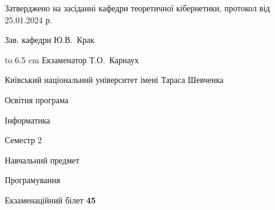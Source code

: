 \documentclass[12pt, ukrainian]{article}
\begin{document}
{\smallskip\smallskip \begin {scriptsize} Затверджено на засіданні кафедри теоретичної кібернетики, протокол   від   25.01.2024 р.\par\smallskip\smallskip\smallskip\smallskip
{\parbox {6.5 cm} {Зав. кафедри \dotfill Ю.В.~Крак}}\hspace {0.7cm} {\hbox to 6.5 cm { Екзаменатор \dotfill Т.О.~Карнаух}} \end{scriptsize}}
\newpage
{{\begin {scriptsize}\par
{ \center  Київський національний університет імені Тараса Шевченка \par}
{\parbox {5 cm}{Освітня програма \hfill}{\parbox {7 cm}{Інформатика\hfill}}\parbox {6 cm}{\hfill Семестр 2}}\par
{\parbox {5 cm} {Навчальний предмет \hfill}\parbox {7 cm}{Програмування \hfill}\parbox {6cm}{\hfill}\par}\vspace{-15pt} \end{scriptsize}}{\center Екзаменаційний білет \No \textbf { 45 }\par}}
\end{document}
